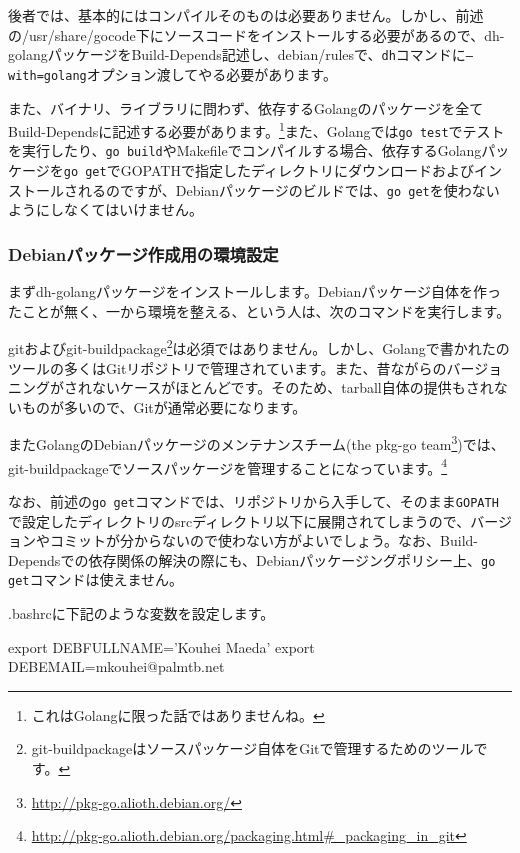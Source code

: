 \documentclass[mingoth,a4paper]{jsarticle}
\begin{document}
後者では、基本的にはコンパイルそのものは必要ありません。しかし、前述の/usr/share/gocode下にソースコードをインストールする必要があるので、dh-golangパッケージをBuild-Depends記述し、debian/rulesで、\texttt{dh}コマンドに\texttt{--with=golang}オプション渡してやる必要があります。

また、バイナリ、ライブラリに問わず、依存するGolangのパッケージを全てBuild-Dependsに記述する必要があります。\footnote{これはGolangに限った話ではありませんね。}また、Golangでは\texttt{go test}でテストを実行したり、\texttt{go build}やMakefileでコンパイルする場合、依存するGolangパッケージを\texttt{go get}でGOPATHで指定したディレクトリにダウンロードおよびインストールされるのですが、Debianパッケージのビルドでは、\texttt{go get}を使わないようにしなくてはいけません。

\subsubsection{Debianパッケージ作成用の環境設定}

まずdh-golangパッケージをインストールします。Debianパッケージ自体を作ったことが無く、一から環境を整える、という人は、次のコマンドを実行します。


gitおよびgit-buildpackage\footnote{git-buildpackageはソースパッケージ自体をGitで管理するためのツールです。}は必須ではありません。しかし、Golangで書かれたのツールの多くはGitリポジトリで管理されています。また、昔ながらのバージョニングがされないケースがほとんどです。そのため、tarball自体の提供もされないものが多いので、Gitが通常必要になります。

またGolangのDebianパッケージのメンテナンスチーム(the pkg-go team\footnote{\url{http://pkg-go.alioth.debian.org/}})では、git-buildpackageでソースパッケージを管理することになっています。\footnote{\url{http://pkg-go.alioth.debian.org/packaging.html\#_packaging_in_git}}

なお、前述の\texttt{go get}コマンドでは、リポジトリから入手して、そのまま\texttt{GOPATH}で設定したディレクトリのsrcディレクトリ以下に展開されてしまうので、バージョンやコミットが分からないので使わない方がよいでしょう。なお、Build-Dependsでの依存関係の解決の際にも、Debianパッケージングポリシー上、\texttt{go get}コマンドは使えません。

.bashrcに下記のような変数を設定します。
\begin{commandline}
export DEBFULLNAME='Kouhei Maeda'
export DEBEMAIL=mkouhei@palmtb.net
\end{commandline}
\end{document}
